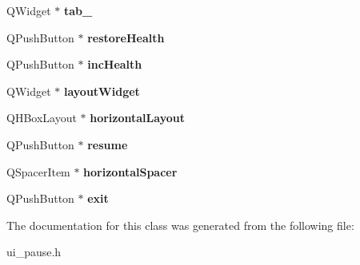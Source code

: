 \begin{DoxyCompactItemize}
\item 
\hypertarget{class_ui___pause_a90afc301cf509c97a33b7fcec631f87c}{Q\-Widget $\ast$ {\bfseries tab\-\_}}\label{class_ui___pause_a90afc301cf509c97a33b7fcec631f87c}

\item 
\hypertarget{class_ui___pause_afd3556b54af701c2cf595d7143d65997}{Q\-Push\-Button $\ast$ {\bfseries restore\-Health}}\label{class_ui___pause_afd3556b54af701c2cf595d7143d65997}

\item 
\hypertarget{class_ui___pause_a874efa7bf05b6985b29194c524b9c0bf}{Q\-Push\-Button $\ast$ {\bfseries inc\-Health}}\label{class_ui___pause_a874efa7bf05b6985b29194c524b9c0bf}

\item 
\hypertarget{class_ui___pause_a952fd2960c5a1272ba25d09fe58db761}{Q\-Widget $\ast$ {\bfseries layout\-Widget}}\label{class_ui___pause_a952fd2960c5a1272ba25d09fe58db761}

\item 
\hypertarget{class_ui___pause_aba248dba2af7138a892f168ddf2c6bab}{Q\-H\-Box\-Layout $\ast$ {\bfseries horizontal\-Layout}}\label{class_ui___pause_aba248dba2af7138a892f168ddf2c6bab}

\item 
\hypertarget{class_ui___pause_a418e4f1b37ad8d68c20bd99514b96938}{Q\-Push\-Button $\ast$ {\bfseries resume}}\label{class_ui___pause_a418e4f1b37ad8d68c20bd99514b96938}

\item 
\hypertarget{class_ui___pause_a89df91a5abb4b5ac7f82f9362dca8315}{Q\-Spacer\-Item $\ast$ {\bfseries horizontal\-Spacer}}\label{class_ui___pause_a89df91a5abb4b5ac7f82f9362dca8315}

\item 
\hypertarget{class_ui___pause_a03665e15a7d5851e4ef871429140c900}{Q\-Push\-Button $\ast$ {\bfseries exit}}\label{class_ui___pause_a03665e15a7d5851e4ef871429140c900}

\end{DoxyCompactItemize}


The documentation for this class was generated from the following file\-:\begin{DoxyCompactItemize}
\item 
ui\-\_\-pause.\-h\end{DoxyCompactItemize}
